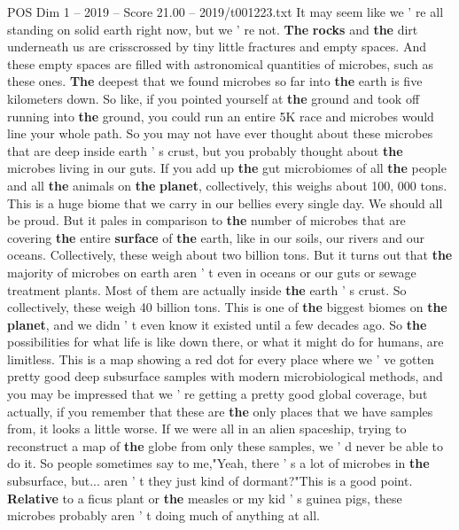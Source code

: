 \begin{textsample}{POS Dim 1 – 2019 – Score 21.00 – 2019/t001223.txt}  \label{ex:f1_pos_058}
It may seem like we ' re all standing on solid earth right now, but we ' re not. \textbf{The} \textbf{rocks} and \textbf{the} dirt underneath us are crisscrossed by tiny little fractures and empty spaces.
And these empty spaces are filled with astronomical quantities of microbes, such as these ones. \textbf{The} deepest that we found microbes so far into \textbf{the} earth is five kilometers down.
So like, if you pointed yourself at \textbf{the} ground and took off running into \textbf{the} ground, you could run an entire 5K race and microbes would line your whole path.
So you may not have ever thought about these microbes that are deep inside earth ' s crust, but you probably thought about \textbf{the} microbes living in our guts.
If you add up \textbf{the} gut microbiomes of all \textbf{the} people and all \textbf{the} animals on \textbf{the} \textbf{planet}, collectively, this weighs about 100, 000 tons.
This is a huge biome that we carry in our bellies every single day.
We should all be proud.
But it pales in comparison to \textbf{the} number of microbes that are covering \textbf{the} entire \textbf{surface} of \textbf{the} earth, like in our soils, our rivers and our oceans.
Collectively, these weigh about two billion tons.
But it turns out that \textbf{the} majority of microbes on earth aren ' t even in oceans or our guts or sewage treatment plants.
Most of them are actually inside \textbf{the} earth ' s crust.
So collectively, these weigh 40 billion tons.
This is one of \textbf{the} biggest biomes on \textbf{the} \textbf{planet}, and we didn ' t even know it existed until a few decades ago.
So \textbf{the} possibilities for what life is like down there, or what it might do for humans, are limitless.
This is a map showing a red dot for every place where we ' ve gotten pretty good deep subsurface samples with modern microbiological methods, and you may be impressed that we ' re getting a pretty good global coverage, but actually, if you remember that these are \textbf{the} only places that we have samples from, it looks a little worse.
If we were all in an alien spaceship, trying to reconstruct a map of \textbf{the} globe from only these samples, we ' d never be able to do it.
So people sometimes say to me,"Yeah, there ' s a lot of microbes in \textbf{the} subsurface, but... aren ' t they just kind of dormant?"This is a good point. \textbf{Relative} to a ficus plant or \textbf{the} measles or my kid ' s guinea pigs, these microbes probably aren ' t doing much of anything at all.

\end{textsample}
